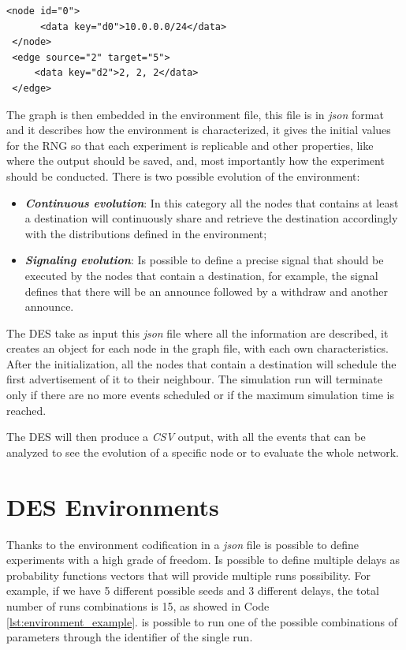 \begin{lstlisting}[language=graphml, caption=Graph example, label=lst:graph_example]
 <node id="0">
      <data key="d0">10.0.0.0/24</data>
 </node>
 <edge source="2" target="5">                                                  
     <data key="d2">2, 2, 2</data>                                             
 </edge> 
\end{lstlisting}

The graph is then embedded in the environment file, this file is in \textit{json}
format and it describes how the environment is characterized, it gives the
initial values for the \ac{RNG} so that each experiment is replicable and
other properties, like where the output should be saved, and, most importantly
how the experiment should be conducted.
There is two possible evolution of the environment:
\begin{itemize}
    \item \textbf{\textit{Continuous evolution}}: In this category all the nodes
    that contains at least a destination will continuously share and retrieve
    the destination accordingly with the distributions defined in the environment;
    \item \textbf{\textit{Signaling evolution}}: Is possible to define a precise
    signal that should be executed by the nodes that contain a destination, for 
    example, the signal  defines that there will be an announce followed by 
    a withdraw and another announce.
\end{itemize}

The \ac{DES} take as input this \textit{json} file where all the information
are described, it creates an object for each node in the graph file, with
each own characteristics.
After the initialization, all the nodes that contain a destination will schedule
the first advertisement of it to their neighbour.
The simulation run will terminate only if there are no more events scheduled or
if the maximum simulation time is reached.

The \ac{DES} will then produce a \textit{CSV} output, with all the events that 
can be analyzed to see the evolution of a specific node or to evaluate the
whole network.
 
\section{DES Environments}
\label{sec:des_environment}

Thanks to the environment codification in a \textit{json} file is possible to
define experiments with a high grade of freedom.
Is possible to define multiple delays as probability functions vectors that
will provide multiple runs possibility. For example, if we have \num{5} different
possible seeds and \num{3} different delays, the total number of runs combinations
is \num{15}, as showed in Code \ref{lst:environment_example}.
is possible to run one of the possible combinations of parameters through the identifier
of the single run.

